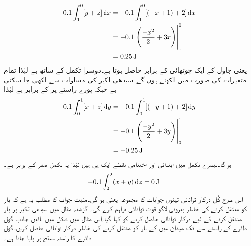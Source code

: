 \begin{align*}
-0.1 \int_{1}^{0} [y+z]\dif x &=-0.1 \int_{1}^{0} [(-x+1)+2] \dif x\\
&=-0.1\left.\left(\frac{-x^2}{2}+3x\right) \right|_{1}^{0}\\
&=\SI{0.25}{\joule}
\end{align*}
یعنی جاول کے ایک چوتھائی کے برابر حاصل ہوتا ہے۔دوسرا تکمل  کے ساتھ ہے لہٰذا تمام متغیرات   کی صورت میں لکھنے ہوں گے۔سیدھی لکیر کی مساوات سے   لکھی جا سکتی ہے جبکہ  پورے راستے پر   کے برابر ہے لہٰذا
\begin{align*}
-0.1 \int_{0}^{1} [x+z]\dif y &=-0.1 \int_{0}^{1} [(-y+1)+2] \dif y\\
&=-0.1 \left.\left(\frac{-y^2}{2}+3y\right) \right|_{0}^{1}\\
&=\SI{-0.25}{\joule}
\end{align*}
ہو گا۔تیسرے تکمل میں ابتدائی اور اختتامی نقطے ایک ہی ہیں لہٰذا یہ تکمل صفر کے برابر ہے۔ 
\begin{align*}
-0.1 \int_{2}^{2} (x+y) \dif z &=\SI{0}{\joule}
\end{align*}
اس طرح کُل درکار توانائی تینوں جوابات کا مجموعہ یعنی   ہو گی۔مثبت جواب کا مطلب یہ ہے کہ بار کو منتقل کرنے کی خاطر بیرونی لاگو قوت توانائی فراہم کرے گی۔ 
گزشتہ مثال میں سیدھی لکیر پر بار منتقل کرنے کے لیے درکار توانائی حاصل کرنے کو کہا گیا۔اس مثال میں شکل  میں بائیں جانب گول دائرے کے راستے  سے  تک  میدان میں  کے بار کو منتقل کرنے کی خاطر درکار توانائی حاصل کریں۔گول دائرے کا راستہ  سطح پر پایا جاتا ہے۔

